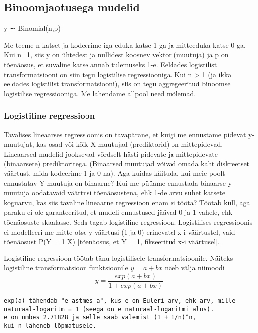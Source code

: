 \documentclass[]{article}
\begin{document}
\subsection{Binoomjaotusega mudelid}\label{binoomjaotusega-mudelid}

y ∼ Binomial(n,p)

Me teeme n katset ja kodeerime iga eduka katse 1-ga ja mitteeduka katse
0-ga. Kui n=1, siis y on ühtedest ja nullidest koosnev vektor (muutuja)
ja p on tõenäosus, et suvaline katse annab tulemuseks 1-e. Eeldades
logistilist transformatsiooni on siin tegu logistilise regressiooniga.
Kui n \textgreater{} 1 (ja ikka eeldades logistilist transformatsiooni),
siis on tegu aggregeeritud binoomse logistilise regressiooniga. Me
lahendame allpool need mõlemad.

\subsubsection{Logistiline regressioon}\label{logistiline-regressioon}

Tavalises lineaarses regressioonis on tavapärane, et kuigi me ennustame
pidevat y-muutujat, kas osad või kõik X-muutujad (prediktorid) on
mittepidevad. Lineaarsed mudelid jooksevad võrdselt hästi pidevate ja
mittepidevate (binaarsete) prediktoritega. (Binaarsed muutujad võivad
omada kaht diskreetset väärtust, mida kodeerime 1 ja 0-na). Aga kuidas
käituda, kui meie poolt ennustatav Y-muutuja on binaarne? Kui me püüame
ennustada binaarse y-muutuja oodatavaid väärtusi tõenäosustena, ehk 1-de
arvu suhet katsete koguarvu, kas siis tavaline lineaarne regressioon
enam ei tööta? Töötab küll, aga paraku ei ole garanteeritud, et mudeli
ennustused jäävad 0 ja 1 vahele, ehk tõenäosuste skaalasse. Seda tagab
logistiline regressioon. Logistilises regressioonis ei modelleeri me
mitte otse y väärtusi (1 ja 0) erinevatel x-i väärtustel, vaid
tõenäosust P(Y = 1 \textbar{} X) {[}tõenäosus, et Y = 1, fikseeritud x-i
väärtusel{]}.

Logistiline regressioon töötab tänu logistilisele transformatsioonile.
Näiteks logistiline transformatsioon funktsioonile \(y = a + bx\) näeb
välja niimoodi \[y=\frac{exp(a + bx)}{1 + exp(a + bx)}\]

\begin{verbatim}
exp(a) tähendab "e astmes a", kus e on Euleri arv, ehk arv, mille 
naturaal-logaritm = 1 (seega on e naturaal-logaritmi alus). 
e on umbes 2.71828 ja selle saab valemist (1 + 1/n)^n, 
kui n läheneb lõpmatusele.
\end{verbatim}
\end{document}

